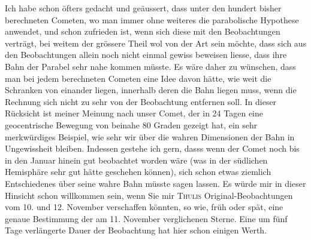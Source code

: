 \par\indent Ich habe schon öfters gedacht und geäussert, dass unter den hundert bisher
berechneten Cometen, wo man immer ohne weiteres die parabolische Hypothese
anwendet, und schon zufrieden ist, wenn sich diese mit den Beobachtungen
verträgt, bei weitem der grössere Theil wol von der Art sein möchte, dass sich
aus den Beobachtungen allein noch nicht einmal gewiss beweisen liesse, dass
ihre Bahn der Parabel sehr nahe kommen müsste. Es wäre daher zu wünschen, dass
man bei jedem berechneten Cometen eine Idee davon hätte, wie weit die
Schranken von einander liegen, innerhalb deren die Bahn liegen muss, wenn die
Rechnung sich nicht zu sehr von der Beobachtung entfernen soll. In dieser
Rücksicht ist meiner Meinung nach unser Comet, der in 24 Tagen eine
geocentrische Bewegung von beinahe 80 Graden gezeigt hat, ein sehr
merkwürdiges Beispiel, wie sehr wir über die wahren Dimensionen der Bahn in
Ungewissheit bleiben. Indessen gestehe ich gern, dasss wenn der Comet noch bis in den Januar hinein gut beobachtet worden wäre (was
in der südlichen Hemisphäre sehr gut hätte geschehen können), sich schon
etwas ziemlich Entschiedenes über seine wahre Bahn müsste sagen lassen. Es
würde mir in dieser Hinsicht schon willkommen sein, wenn Sie mir
\textsc{Thulis} Original-Beobachtungen vom 10. und 12. November verschaffen
könnten, so wie, früh oder spät, eine genaue Bestimmung der am 11. November
verglichenen Sterne. Eine um fünf Tage verlängerte Dauer der Beobachtung hat
hier schon einigen Werth.

